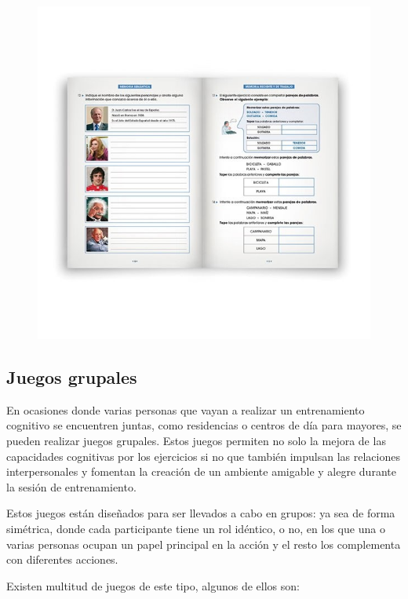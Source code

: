 \begin{figure}[H]
\begin{minipage}{.5\textwidth}
  \includegraphics[width=.9\linewidth]{03.EstudioProblema/01.EstadoArte/00.Figuras/03.cuaderno_rubio.jpg}
  \label{fig:EA_cuardernoRubio}
\end{minipage}
\end{figure}



\subsection{Juegos grupales}

En ocasiones donde varias personas que vayan a realizar un entrenamiento cognitivo se encuentren juntas, como residencias o centros de día para mayores, se pueden realizar juegos grupales. Estos juegos permiten no solo la mejora de las capacidades cognitivas por los ejercicios si no que también impulsan las relaciones interpersonales y fomentan la creación de un ambiente amigable y alegre durante la sesión de entrenamiento. \cite{EA_ent_grupos}

Estos juegos están diseñados para ser llevados a cabo en grupos: ya sea de forma simétrica, donde cada participante tiene un rol idéntico, o no, en los que una o varias personas ocupan un papel principal en la acción y el resto los complementa con diferentes acciones.

Existen multitud de juegos de este tipo, algunos de ellos son:

